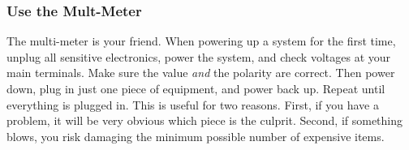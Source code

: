 \subsubsection{Use the Mult-Meter}

The multi-meter is your friend. When powering up a system for the first time, unplug all sensitive electronics, power the system, and check voltages at your main terminals. Make sure the value \textit{and} the polarity are correct. Then power down, plug in just one piece of equipment, and power back up. Repeat until everything is plugged in. This is useful for two reasons. First, if you have a problem, it will be very obvious which piece is the culprit. Second, if something blows, you risk damaging the minimum possible number of expensive items.